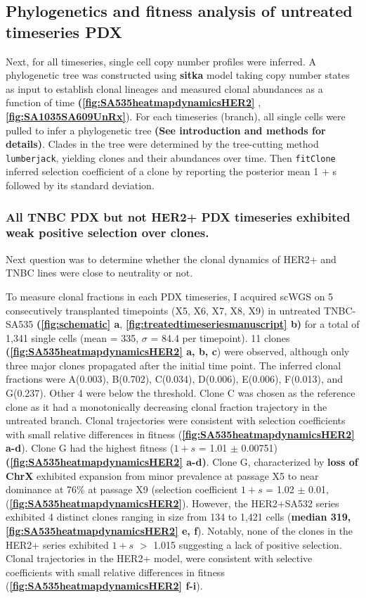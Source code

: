\subsection{Phylogenetics and fitness analysis of untreated timeseries PDX}
 Next, for all timeseries, single cell copy number profiles were inferred. A phylogenetic tree was constructed using \textbf{sitka} model taking copy number states as input to establish clonal lineages and measured clonal abundances as a function of time \textbf{(\autoref{fig:SA535heatmapdynamicsHER2} }, \textbf{\autoref{fig:SA1035SA609UnRx}}). For each timeseries (branch),   all single cells were pulled to infer a phylogenetic tree \textbf{(See introduction and methods for details)}. Clades in the tree were determined by the tree-cutting method \texttt{lumberjack}, yielding clones and their abundances over time. Then \texttt{fitClone} inferred selection coefficient of a clone by reporting the posterior mean 1 + s followed by its standard deviation.

\subsubsection{All TNBC PDX but not HER2+ PDX timeseries exhibited weak positive selection over clones.}
Next question was to determine whether the clonal dynamics of HER2+ and TNBC lines were close to neutrality or not.

To measure clonal fractions in each PDX timeseries, I acquired scWGS on 5 consecutively transplanted timepoints (X5, X6, X7, X8, X9) in untreated TNBC-SA535 \textbf{(\autoref{fig:schematic} a}, \textbf{\autoref{fig:treatedtimeseriesmanuscript} b)} for a total of 1,341 single cells (mean = 335, $\sigma$ = 84.4 per timepoint).
11 clones \textbf{(\autoref{fig:SA535heatmapdynamicsHER2} a, b, c}) were observed, although only three major clones propagated after the initial time point.
The inferred clonal fractions were A(0.003), B(0.702), C(0.034), D(0.006), E(0.006), F(0.013), and G(0.237). Other 4 were below the threshold.
Clone C was chosen as the reference clone as it had a monotonically decreasing clonal fraction trajectory in the untreated branch. Clonal trajectories were consistent with selection coefficients
with small relative differences in fitness (\textbf{\autoref{fig:SA535heatmapdynamicsHER2} a-d}). Clone G had the highest fitness ($1+s$ = 1.01 $\pm$ 0.00751) \textbf{(\autoref{fig:SA535heatmapdynamicsHER2} a-d)}. 
 Clone G, characterized by \textbf{loss of ChrX} exhibited expansion from minor prevalence at passage X5 to near dominance at 76\% at passage X9 (selection coefficient $1+s$ = 1.02  $\pm$  0.01, (\textbf{\autoref{fig:SA535heatmapdynamicsHER2}}). 
 However, the HER2+SA532 series exhibited 4 distinct clones ranging in size from 134 to 1,421 cells (\textbf{median 319, \textbf{\autoref{fig:SA535heatmapdynamicsHER2} e, f}}). Notably, none of the clones in the HER2+ series exhibited $1+s$ $>$ 1.015 suggesting a lack of positive selection.
 Clonal trajectories in the HER2+ model, were consistent with selective coefficients with small relative differences in fitness (\textbf{\autoref{fig:SA535heatmapdynamicsHER2} f-i}).

